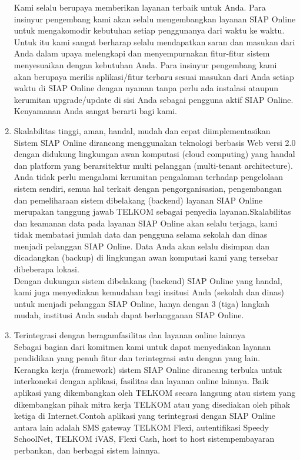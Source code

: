 \begin{enumerate}
Kami selalu berupaya memberikan layanan terbaik untuk Anda. Para insinyur pengembang kami akan selalu mengembangkan layanan SIAP Online untuk mengakomodir kebutuhan setiap penggunanya dari waktu ke waktu.\\
Untuk itu kami sangat berharap selalu mendapatkan saran dan masukan dari Anda dalam upaya melengkapi dan menyempurnakan fitur-fitur sistem menyesuaikan dengan kebutuhan Anda. Para insinyur pengembang kami akan berupaya merilis aplikasi/fitur terbaru sesuai masukan dari Anda setiap waktu di SIAP Online dengan nyaman tanpa perlu ada instalasi ataupun kerumitan upgrade/update di sisi Anda sebagai pengguna  aktif SIAP Online. Kenyamanan Anda sangat berarti bagi  kami.
\item Skalabilitas tinggi, aman, handal,  mudah dan cepat diimplementasikan\\
Sistem SIAP Online dirancang menggunakan teknologi berbasis Web versi 2.0 dengan didukung lingkungan awan komputasi (cloud computing) yang handal dan platform yang berarsitektur multi pelanggan (multi-tenant architecture). Anda tidak perlu mengalami kerumitan pengalaman terhadap pengelolaan sistem sendiri, semua hal terkait dengan pengorganisasian, pengembangan dan pemeliharaan sistem dibelakang (backend) layanan SIAP Online merupakan tanggung jawab TELKOM sebagai penyedia layanan.Skalabilitas dan keamanan data pada layanan SIAP Online akan selalu terjaga, kami tidak membatasi jumlah data dan pengguna selama sekolah dan dinas menjadi pelanggan SIAP Online. Data Anda akan selalu disimpan dan dicadangkan (backup) di lingkungan awan komputasi  kami yang tersebar dibeberapa lokasi.\\
Dengan dukungan sistem dibelakang (backend) SIAP Online yang handal, kami juga menyediakan kemudahan bagi insitusi Anda (sekolah dan dinas) untuk menjadi pelanggan SIAP Online, hanya dengan 3 (tiga) langkah mudah, institusi Anda sudah dapat  berlangganan SIAP Online.
\item Terintegrasi  dengan beragamfasilitas dan layanan online lainnya\\
Sebagai bagian dari komitmen kami untuk dapat menyediakan layanan pendidikan yang penuh fitur dan terintegrasi satu dengan yang lain. Kerangka kerja (framework) sistem SIAP Online dirancang terbuka untuk interkoneksi dengan aplikasi, fasilitas dan layanan online lainnya. Baik aplikasi yang dikembangkan oleh TELKOM secara langsung atau sistem yang dikembangkan pihak mitra kerja TELKOM atau yang disediakan oleh pihak ketiga di Internet.Contoh aplikasi yang terintegrasi dengan SIAP Online antara  lain adalah SMS gateway TELKOM Flexi, autentifikasi Speedy SchoolNet, TELKOM iVAS, Flexi Cash, host to host sistempembayaran perbankan, dan berbagai  sistem lainnya.\\

\end{enumerate}
